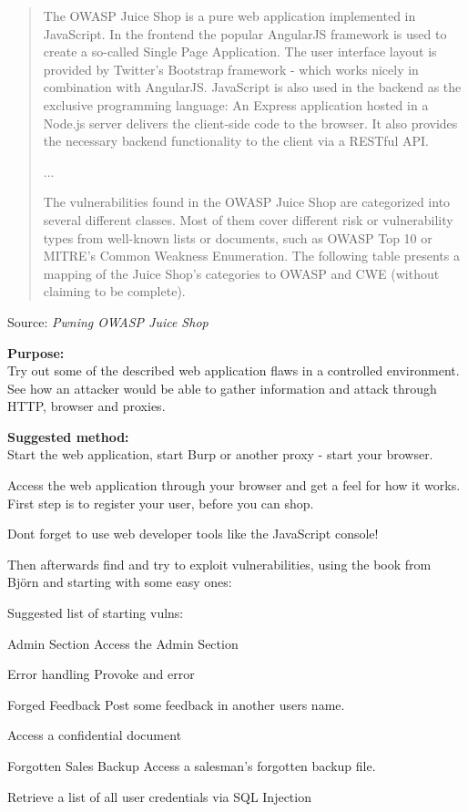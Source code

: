 \documentclass[a4paper,11pt,notitlepage]{report}
\begin{document}
\begin{quote}
The OWASP Juice Shop is a pure web application implemented in JavaScript. In the
frontend the popular AngularJS framework is used to create a so-called Single Page
Application. The user interface layout is provided by Twitter's Bootstrap framework - which
works nicely in combination with AngularJS.
JavaScript is also used in the backend as the exclusive programming language: An Express
application hosted in a Node.js server delivers the client-side code to the browser. It also
provides the necessary backend functionality to the client via a RESTful API.

...

The vulnerabilities found in the OWASP Juice Shop are categorized into several different
classes. Most of them cover different risk or vulnerability types from well-known lists or
documents, such as OWASP Top 10 or MITRE's Common Weakness Enumeration. The
following table presents a mapping of the Juice Shop's categories to OWASP and CWE
(without claiming to be complete).
\end{quote}

Source: \emph{Pwning OWASP Juice Shop}


 {\bf Purpose:}\\
 Try out some of the described web application flaws in a controlled environment. See how an attacker would be able to gather information and attack through HTTP, browser and proxies.

 {\bf Suggested method:}\\
Start the web application, start Burp or another proxy - start your browser.

Access the web application through your browser and get a feel for how it works. First step is to register your user, before you can shop.

Dont forget to use web developer tools like the JavaScript console!

Then afterwards find and try to exploit vulnerabilities, using the book from Björn and starting with some easy ones:

Suggested list of starting vulns:
\begin{list2}
\item Admin Section Access the Admin Section
\item Error handling Provoke and error
\item Forged Feedback Post some feedback in another users name.
\item Access a confidential document
\item Forgotten Sales Backup Access a salesman's forgotten backup file.
\item Retrieve a list of all user credentials via SQL Injection
\end{list2}
\end{document}

